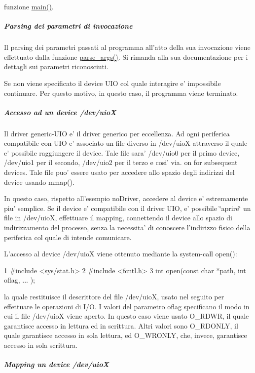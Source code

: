 funzione \hyperlink{uio-int_8c_a3c04138a5bfe5d72780bb7e82a18e627}{main()}. 

\subparagraph*{Parsing dei parametri di invocazione}

Il parsing dei parametri passati al programma all'atto della sua invocazione viene effettuato dalla funzione \hyperlink{uio-int_8c_ab6b18eb1bf7bc996599c06dc6dad8f53}{parse\+\_\+args()}. Si rimanda alla sua documentazione per i dettagli sui parametri riconosciuti.

Se non viene specificato il device U\+I\+O col quale interagire e' impossibile continuare. Per questo motivo, in questo caso, il programma viene terminato.

\subparagraph*{Accesso ad un device /dev/uio\+X}

Il driver generic-\/\+U\+I\+O e' il driver generico per eccellenza. Ad ogni periferica compatibile con U\+I\+O e' associato un file diverso in /dev/uio\+X attraverso il quale e' possibile raggiungere il device. Tale file sara' /dev/uio0 per il primo device, /dev/uio1 per il secondo, /dev/uio2 per il terzo e cosi' via. on for subsequent devices. Tale file puo' essere usato per accedere allo spazio degli indirizzi del device usando mmap().

In questo caso, rispetto all'esempio no\+Driver, accedere al device e' estremamente piu' semplice. Se il device e' compatibile con il driver U\+I\+O, e' possibile \char`\"{}aprire\char`\"{} un file in /dev/uio\+X, effettuare il mapping, connettendo il device allo spazio di indirizzamento del processo, senza la necessita' di conoscere l'indirizzo fisico della periferica col quale di intende comunicare.

L'accesso al device /dev/uio\+X viene ottenuto mediante la system-\/call open()\+: 
\begin{DoxyCode}
1 #include <sys/stat.h>
2 #include <fcntl.h>
3 int open(const char *path, int oflag, ...  );
\end{DoxyCode}
 la quale restituisce il descrittore del file /dev/uio\+X, usato nel seguito per effettuare le operazioni di I/\+O. I valori del parametro oflag specificano il modo in cui il file /dev/uio\+X viene aperto. In questo caso viene usato O\+\_\+\+R\+D\+W\+R, il quale garantisce accesso in lettura ed in scrittura. Altri valori sono O\+\_\+\+R\+D\+O\+N\+L\+Y, il quale garantisce accesso in sola lettura, ed O\+\_\+\+W\+R\+O\+N\+L\+Y, che, invece, garantisce accesso in sola scrittura.

\subparagraph*{Mapping un device /dev/uio\+X}

